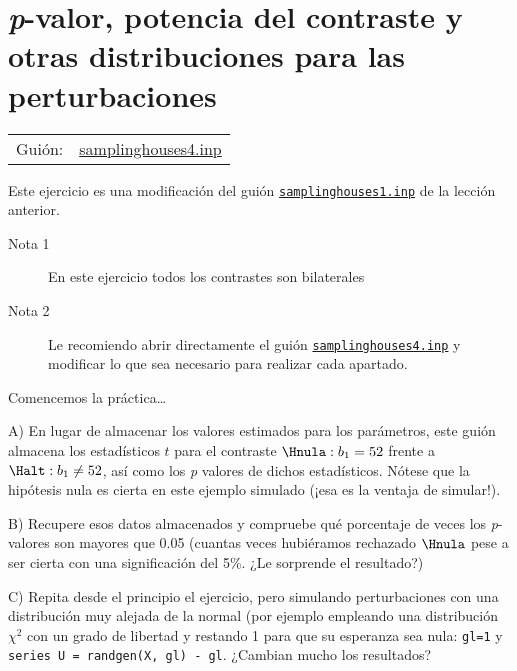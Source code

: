 \documentclass[11pt]{article}
\begin{document}
\section{\emph{p}-valor, potencia del contraste y otras distribuciones para las perturbaciones}
\label{sec:org5c7931d}
\begin{center}
\begin{tabular}{ll}
Guión: & \href{https://github.com/mbujosab/Ectr/tree/master/Practicas/Gretl/scripts/samplinghouses4.inp}{samplinghouses4.inp}\\[0pt]
\end{tabular}
\end{center}

Este ejercicio es una modificación del guión \href{https://github.com/mbujosab/Ectr/tree/master/Practicas/Gretl/scripts/samplinghouses1.inp}{\texttt{samplinghouses1.inp}} de
la lección anterior.


\begin{description}
\item[{Nota 1}] En este ejercicio todos los contrastes son bilaterales

\item[{Nota 2}] Le recomiendo abrir directamente el guión
\href{https://github.com/mbujosab/Ectr/tree/master/Practicas/Gretl/scripts/samplinghouses4.inp}{\texttt{samplinghouses4.inp}} y modificar lo que sea necesario para realizar
cada apartado.
\end{description}

Comencemos la práctica\ldots{}

A) En lugar de almacenar los valores estimados para los parámetros,
   este guión almacena los estadísticos \(t\) para el contraste \(\Hnula:
   b_1=52\) frente a \(\Halt: b_1\ne 52\), así como los \emph{p} valores de
   dichos estadísticos. Nótese que la hipótesis nula es cierta en este
   ejemplo simulado (¡esa es la ventaja de simular!).

B) Recupere esos datos almacenados y compruebe qué porcentaje de veces
   los \emph{p}-valores son mayores que 0.05 (cuantas veces hubiéramos
   rechazado \(\Hnula\) pese a ser cierta con una significación del
   5\%. ¿Le sorprende el resultado?)

C) Repita desde el principio el ejercicio, pero simulando
   perturbaciones con una distribución muy alejada de la normal (por
   ejemplo empleando una distribución \(\chi^2\) con un grado de
   libertad y restando 1 para que su esperanza sea nula: \texttt{gl=1} y
   \texttt{series U = randgen(X, gl) - gl}. ¿Cambian mucho los resultados?
\end{document}
